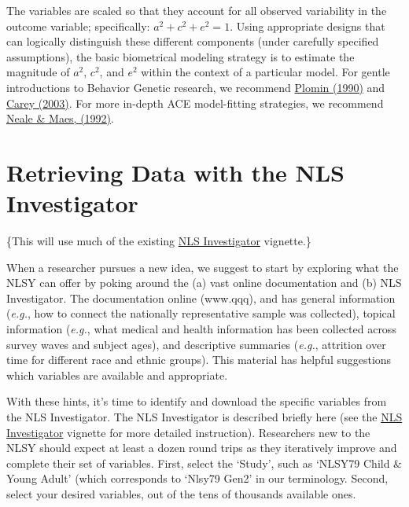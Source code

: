 \documentclass[smallextended]{svjour3}       %
\begin{document}
The variables are scaled so that they account for all observed
variability in the outcome variable; specifically:
\(a^2 + c^2 + e^2 = 1\). Using appropriate designs that can logically
distinguish these different components (under carefully specified
assumptions), the basic biometrical modeling strategy is to estimate the
magnitude of \(a^2\), \(c^2\), and \(e^2\) within the context of a
particular model. For gentle introductions to Behavior Genetic research,
we recommend
\href{http://books.google.com/books?id=r7AgAQAAIAAJ\&source=gbs_navlinks_s}{Plomin
(1990)} and \href{http://psych.colorado.edu/~carey/hgss/}{Carey (2003)}.
For more in-depth ACE model-fitting strategies, we recommend
\href{http://www.vipbg.vcu.edu/OpenMxFall09/NMbook05.pdf}{Neale \& Maes,
(1992)}.

\hypertarget{retrieving-data-with-the-nls-investigator}{%
\section{Retrieving Data with the NLS
Investigator}\label{retrieving-data-with-the-nls-investigator}}

\{This will use much of the existing
\href{https://nlsy-links.github.io/NlsyLinks/docs/articles/nls-investigator.html}{NLS
Investigator} vignette.\}

When a researcher pursues a new idea, we suggest to start by exploring
what the NLSY can offer by poking around the (a) vast online
documentation and (b) NLS Investigator. The documentation online
(www.qqq), and has general information (\emph{e.g.}, how to connect the
nationally representative sample was collected), topical information
(\emph{e.g.}, what medical and health information has been collected
across survey waves and subject ages), and descriptive summaries
(\emph{e.g.}, attrition over time for different race and ethnic groups).
This material has helpful suggestions which variables are available and
appropriate.

With these hints, it's time to identify and download the specific
variables from the NLS Investigator. The NLS Investigator is described
briefly here (see the
\href{https://github.com/nlsy-links/NlsyLinks/blob/master/inst/doc/NlsInvestigator.pdf}{NLS
Investigator} vignette for more detailed instruction). Researchers new
to the NLSY should expect at least a dozen round trips as they
iteratively improve and complete their set of variables. First, select
the `Study', such as `NLSY79 Child \& Young Adult' (which corresponds to
`Nlsy79 Gen2' in our terminology. Second, select your desired variables,
out of the tens of thousands available ones.
\end{document}
